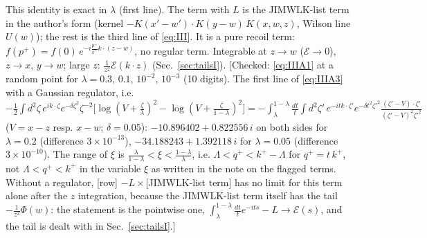 \documentclass[9pt]{article}
\numberwithin{equation}{section}
\begin{document}
This identity is exact in $\lambda$ (first line). The term with $L$ is the JIMWLK-list term in the author's form (kernel $-K(x'-w')\cdot K(y-w)\,K(x,w,z)$, Wilson line $U(w)$); the rest is the third line of \eqref{eq:III}. It is a pure recoil term: $f(p^{+})=f(0)\,e^{-i\frac{p^{+}}{k^{+}}k\cdot(z-w)}$, no regular term. Integrable at $z\to w$ ($\mathcal{E}\to0$), $z\to x$, $y\to w$; large $z$: $\frac{1}{z^{2}}\mathcal{E}(k\cdot z)$ (Sec.~\ref{sec:tailsI}). {\color{gray}\small [Checked: \eqref{eq:IIIA1} at a random point for $\lambda=0.3,\,0.1,\,10^{-2},\,10^{-3}$ (10 digits). The first line of \eqref{eq:IIIA3} with a Gaussian regulator, i.e. $-\frac12\int d^{2}\zeta\,e^{ik\cdot\zeta}e^{-\delta\zeta^{2}}\zeta^{-2}\big[\log(V+\frac{\zeta}{\lambda})^{2}-\log(V+\frac{\zeta}{1-\lambda})^{2}\big]=-\int_{\lambda}^{1-\lambda}\frac{dt}{t}\int d^{2}\zeta'\,e^{-itk\cdot\zeta'}e^{-\delta t^{2}\zeta'^{2}}\frac{(\zeta'-V)\cdot\zeta'}{(\zeta'-V)^{2}\zeta'^{2}}$ ($V=x-z$ resp. $x-w$; $\delta=0.05$): $-10.896402+0.822556\,i$ on both sides for $\lambda=0.2$ (difference $3\times10^{-13}$), $-34.188243+1.392118\,i$ for $\lambda=0.05$ (difference $3\times10^{-10}$). The range of $\xi$ is $\frac{\lambda}{1-\lambda}<\xi<\frac{1-\lambda}{\lambda}$, i.e. $\Lambda<q^{+}<k^{+}-\Lambda$ for $q^{+}=t\,k^{+}$, not $\Lambda<q^{+}<k^{+}$ in the variable $\xi$ as written in the note on the flagged terms. Without a regulator, [row] $-L\times$[JIMWLK-list term] has no limit for this term alone after the $z$ integration, because the JIMWLK-list term itself has the tail $-\frac{1}{z^{2}}\Phi(w)$: the statement is the pointwise one, $\int_{\lambda}^{1-\lambda}\frac{dt}{t}e^{-its}-L\to\mathcal{E}(s)$, and the tail is dealt with in Sec.~\ref{sec:tailsI}.]}
\end{document}
